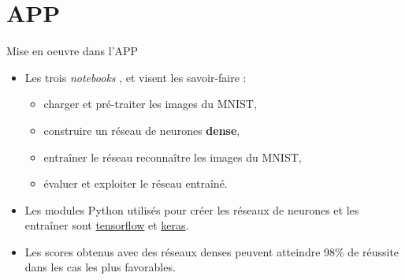 \documentclass[10pt,serif,mathserif,compress,hyperref={colorlinks}]{beamer}
\begin{document}
\section{APP}

\begin{frame}{Mise en oeuvre dans l'APP}

  \begin{tcolorbox}[title=1 -- Auto-formation / Réseau dense]
    \begin{itemize}
    \item Les trois {\em notebooks} ,  et  visent les savoir-faire :
      \begin{itemize}
      \item charger et pré-traiter les images du MNIST,
      \item construire un réseau de neurones {\bf dense},
      \item entraîner le réseau reconnaître les images du MNIST,
      \item évaluer et exploiter le réseau entraîné.
      \end{itemize}
      
    \item Les modules Python utilisés pour créer les réseaux de neurones et les entraîner sont \href{https://www.tensorflow.org/tutorials}{tensorflow}
      et \href{https://www.tensorflow.org/versions/r2.4/api_docs/python/tf}{keras}.
    \item Les scores obtenus avec des réseaux denses peuvent atteindre 98\% de réussite dans les cas les plus favorables.
    \end{itemize}
  \end{tcolorbox}

\end{frame}
\end{document}
